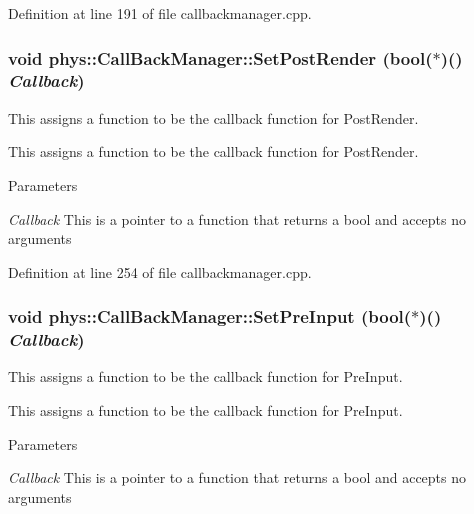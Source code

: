 Definition at line 191 of file callbackmanager.cpp.

\hypertarget{classphys_1_1CallBackManager_afe6a91491f3872599d2c5784a902361a}{
\subsubsection[{SetPostRender}]{\setlength{\rightskip}{0pt plus 5cm}void phys::CallBackManager::SetPostRender (bool($\ast$)() {\em Callback})}}
\label{d1/d47/classphys_1_1CallBackManager_afe6a91491f3872599d2c5784a902361a}


This assigns a function to be the callback function for PostRender. 

This assigns a function to be the callback function for PostRender. 
\begin{DoxyParams}{Parameters}
\item[{\em Callback}]This is a pointer to a function that returns a bool and accepts no arguments \end{DoxyParams}


Definition at line 254 of file callbackmanager.cpp.

\hypertarget{classphys_1_1CallBackManager_a1efb0c185304376986093beebf08a277}{
\subsubsection[{SetPreInput}]{\setlength{\rightskip}{0pt plus 5cm}void phys::CallBackManager::SetPreInput (bool($\ast$)() {\em Callback})}}
\label{d1/d47/classphys_1_1CallBackManager_a1efb0c185304376986093beebf08a277}


This assigns a function to be the callback function for PreInput. 

This assigns a function to be the callback function for PreInput. 
\begin{DoxyParams}{Parameters}
\item[{\em Callback}]This is a pointer to a function that returns a bool and accepts no arguments \end{DoxyParams}


